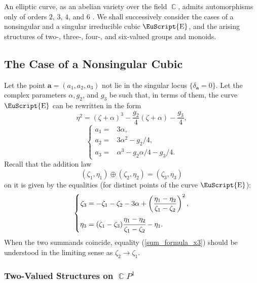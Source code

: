 \documentclass[14pt, dvipsnames]{extarticle}
\theoremstyle{plain}
\theoremstyle{definition}
\theoremstyle{remark}
\DeclareMathOperator{\E}{\EuScript{E}}
\DeclareMathOperator{\Cc}{\mathbb{C}}
\begin{document}
An elliptic curve, as an abelian variety over the field $\Cc$, admits automorphisms only of orders $2$, $3$, $4$, and $6$ \cite[Corollary 4.7]{Hartshorne}. We shall successively consider the cases of a nonsingular and a singular irreducible cubic $\E$, and the arising structures of two-, three-, four-, and six-valued groups and monoids.  






\subsection{The Case of a Nonsingular Cubic}\label{The_case_of_non-singular_cubic}

Let the point $\boldsymbol{a} = (a_1,a_2,a_3)$ not lie in the singular locus $\{\delta_{\boldsymbol{a}} = 0\}$. Let the complex parameters $\alpha, g_2$, and $g_3$ be such that, in terms of them, the curve $\E$ can be rewritten in the form
$$\eta^2 = (\zeta + \alpha)^3 -\frac{g_2}{4}(\zeta + \alpha) - \frac{g_3}{4},$$
\begin{equation}\label{a1a2a3_system}
\begin{cases}
a_{1}= & 3\alpha,\\
a_{2}= & 3\alpha^{2}-g_{2}/4,\\
a_{3}= & \alpha^{3}-g_{2}\alpha/4-g_{3}/4.
\end{cases}
\end{equation}
Recall that the addition law
$$(\zeta_1, \eta_1)\oplus (\zeta_2, \eta_2) = (\zeta_3, \eta_3)$$
on it is given by the equalities (for distinct points of the curve $\E$):
\begin{equation}\label{sum_formula_x3}
\left\{\begin{aligned} 
\zeta_3 &= -\zeta_1 - \zeta_2 - 3\alpha + \left(\frac{\eta_1 - \eta_2}{\zeta_1 - \zeta_2}\right)^2,\\ 
\eta_3 &= (\zeta_1 - \zeta_3)\cfrac{\eta_1 - \eta_2}{\zeta_1 - \zeta_2} - \eta_1.
\end{aligned}\right.
\end{equation}
When the two summands coincide, equality (\ref{sum_formula_x3}) should be understood in the limiting sense as $\zeta_2\to \zeta_1$.

\subsubsection{Two-Valued Structures on $\Cc\!P^1$}\label{2_valued_structures_on_CP_1} 
\end{document}

